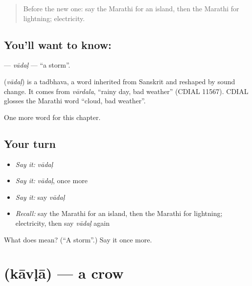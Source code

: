 \label{lesson:MR-C141-vadal}



\begin{quote}
Before the new one: say the Marathi for an island, then the Marathi for lightning; electricity.
\end{quote}

\subsection*{You'll want to know: }
\textbf{} — \emph{vādaḷ} — \textquotedblleft{}a storm\textquotedblright{}.

\begin{cousinweb}
\textbf{} (\emph{vādaḷ}) is a tadbhava, a word inherited from Sanskrit and reshaped by sound change. It comes from \emph{vārdala}, \textquotedblleft{}rainy day, bad weather\textquotedblright{} (CDIAL 11567). CDIAL glosses the Marathi word \textquotedblleft{}cloud, bad weather\textquotedblright{}.
\end{cousinweb}

\begin{grammarlens}[title={What you've built}]
One more word for this chapter.
\end{grammarlens}

\subsection*{Your turn}
\begin{itemize}
\raggedright
  \item \emph{Say it:} \emph{vādaḷ}
  \item \emph{Say it:} \emph{vādaḷ}, once more
  \item \emph{Say it:} say \emph{vādaḷ}
  \item \emph{Recall:} say the Marathi for an island, then the Marathi for lightning; electricity, then say \emph{vādaḷ} again
\end{itemize}

\begin{tcolorbox}[breakable,colback=teal!4,colframe=teal!35!black,title={Before you move on}]
What does  mean? (\textquotedblleft{}A storm\textquotedblright{}.) Say it once more.
\end{tcolorbox}
\section[\texorpdfstring{\mr{कावळा} (kāvḷā)}{कावळा (kāvḷā)}]{ (kāvḷā) — a crow}

